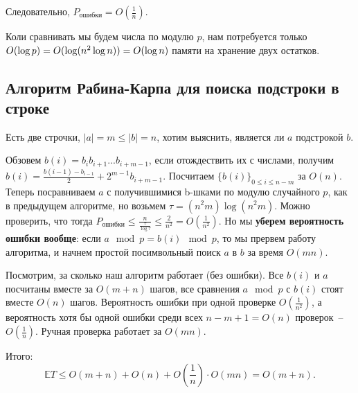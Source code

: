 Следовательно, $P_\text{ошибки} = O(\frac{1}{n})$.

Коли сравнивать мы будем числа по модулю $p$, нам потребуется только $O(\log p) = \\ O(\log(n^2\log n)) = O(\log n)$ памяти на хранение двух остатков.

\subsection{Алгоритм Рабина-Карпа для поиска подстроки в строке}

Есть две строчки, $|a|=m\le|b|=n$, хотим выяснить, является ли $a$ подстрокой $b$.

Обзовем $b(i)=b_i b_{i+1}...b_{i+m-1}$, если отождествить их с числами, получим $b(i)=\frac{b(i-1)-b_{i-1}}{2}+2^{m-1} b_{i+m-1}$. Посчитаем $\{b(i)\}_{0\le i\le n-m}$ за $O(n)$. Теперь посравниваем $a$ с получившимися b-шками по модулю случайного $p$, как в предыдущем алгоритме, но возьмем $\tau=(n^2m)\log(n^2m)$. Можно проверить, что тогда $P_{\text{ошибки}}\le\frac{n}{\frac{\tau}{\log\tau}}\le\frac{2}{n^2}=O(\frac{1}{n^2})$. Но мы \textbf{уберем вероятность ошибки вообще}: если $a\mod{p}=b(i)\mod{p}$, то мы прервем работу алгоритма, и начнем простой посимвольный поиск $a$ в $b$ за время $O(mn)$.

Посмотрим, за сколько наш алгоритм работает (без ошибки). Все $b(i)$ и $a$ посчитаны вместе за $O(m+n)$ шагов, все сравнения $a \mod{p}$ с $b(i)$ стоят вместе $O(n)$ шагов. Вероятность ошибки при одной проверке $O(\frac{1}{n^2})$, а вероятность хотя бы одной ошибки среди всех $n-m+1 = O(n)$ проверок~-- $O(\frac{1}{n})$. Ручная проверка работает за $O(mn)$. 

Итого: $$\mathbb E T\le O(m+n) + O(n) + O(\frac{1}{n})\cdot O(mn) = O(m+n).$$